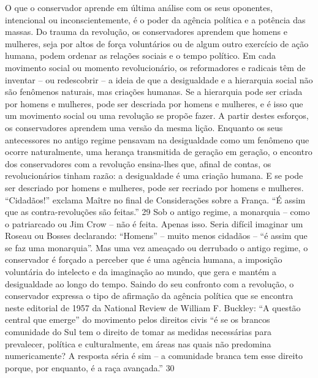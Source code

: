  
\par
 
O que o conservador aprende em última análise com os seus oponentes, intencional ou inconscientemente, é o poder da agência política e a potência das massas. Do trauma da revolução, os conservadores aprendem que homens e mulheres, seja por altos de força voluntários ou de algum outro exercício de ação humana, podem ordenar as relações sociais e o tempo político. Em cada movimento social ou momento revolucionário, os reformadores e radicais têm de inventar – ou redescobrir – a ideia de que a desigualdade e a hierarquia social não são fenômenos naturais, mas criações humanas. Se a hierarquia pode ser criada por homens e mulheres, pode ser descriada por homens e mulheres, e é isso que um movimento social ou uma revolução se propõe fazer. A partir destes esforços, os conservadores aprendem uma versão da mesma lição. Enquanto os seus antecessores no antigo regime pensavam na desigualdade como um fenômeno que ocorre naturalmente, uma herança transmitida de geração em geração, o encontro dos conservadores com a revolução ensina-lhes que, afinal de contas, os revolucionários tinham razão: a desigualdade é uma criação humana. E se pode ser descriado por homens e mulheres, pode ser recriado por homens e mulheres. “Cidadãos!” exclama Maître no final de Considerações sobre a França. “É assim que as contra-revoluções são feitas.”
 {\color{blue} 29}  
Sob o antigo regime, a monarquia – como o patriarcado ou Jim Crow – não é feita. Apenas isso. Seria difícil imaginar um Roseau ou Bosses declarando: “Homens” – muito menos cidadãos – “é assim que se faz uma monarquia”. Mas uma vez ameaçado ou derrubado o antigo regime, o conservador é forçado a perceber que é uma agência humana, a imposição voluntária do intelecto e da imaginação ao mundo, que gera e mantém a desigualdade ao longo do tempo. Saindo do seu confronto com a revolução, o conservador expressa o tipo de afirmação da agência política que se encontra neste editorial de 1957 da National Review de William F. Buckley: “A questão central que emerge” do movimento pelos direitos civis “é se os brancos comunidade do Sul tem o direito de tomar as medidas necessárias para prevalecer, política e culturalmente, em áreas nas quais não predomina numericamente? A resposta séria é sim – a comunidade branca tem esse direito porque, por enquanto, é a raça avançada.”
 {\color{blue} 30}  

 
\par
 
